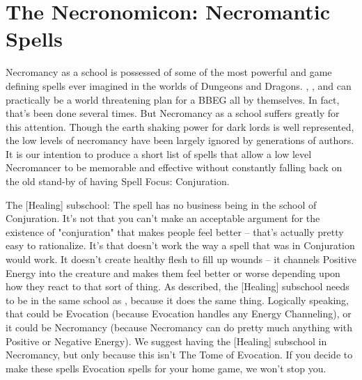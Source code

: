 \section{The Necronomicon: Necromantic Spells}

Necromancy as a school is possessed of some of the most powerful and game defining spells ever imagined in the worlds of Dungeons and Dragons. , , and  can practically be a world threatening plan for a BBEG all by themselves. In fact, that's been done several times. But Necromancy as a school suffers greatly for this attention. Though the earth shaking power for dark lords is well represented, the low levels of necromancy have been largely ignored by generations of authors. It is our intention to produce a short list of spells that allow a low level Necromancer to be memorable and effective without constantly falling back on the old stand-by of having Spell Focus: Conjuration.

The [Healing] subschool:
The spell  has no business being in the school of Conjuration. It's not that you can't make an acceptable argument for the existence of "conjuration" that makes people feel better -- that's actually pretty easy to rationalize. It's that  doesn't work the way a spell that was in Conjuration would work. It doesn't create healthy flesh to fill up wounds -- it channels Positive Energy into the creature and makes them feel better or worse depending upon how they react to that sort of thing. As described, the [Healing] subschool needs to be in the same school as , because it does the same thing. Logically speaking, that could be Evocation (because Evocation handles any Energy Channeling), or it could be Necromancy (because Necromancy can do pretty much anything with Positive or Negative Energy). We suggest having the [Healing] subschool in Necromancy, but only because this isn't The Tome of Evocation. If you decide to make these spells Evocation spells for your home game, we won't stop you.\\

